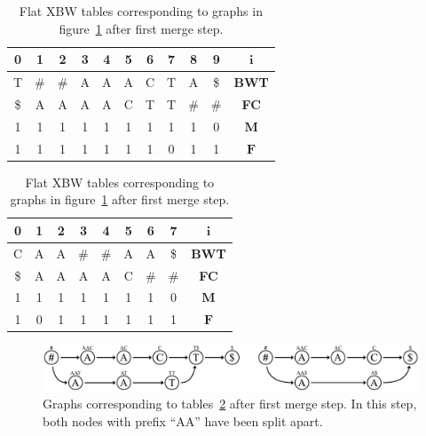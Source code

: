 \documentclass[a4paper,12pt,twoside,BCOR=10mm]{scrbook}
\begin{document}
\begin{table}[htb]
\centering
\caption[Flat XBW tables after first merge step]{Flat XBW tables corresponding to graphs in figure~\ref{fig:evo_fig_flat_merge_step_one} after first merge step.}
{
\renewcommand{\tabcolsep}{5pt}
\begin{tabular}{ | c | c | c | c | c | c | c | c | c | c | c | }
\hline
0 & 1 & 2 & 3 & 4 & 5 & 6 & 7 & 8 & 9 & $\boldsymbol{i}$ \\ \hline
T & $\#$ & $\#$ & A & A & A & C & T & A & \$ & \textbf{BWT} \\ \hline
\$ & A & A & A & A & C & T & T & $\#$ & $\#$ & \textbf{FC} \\ \hline
1 & 1 & 1 & 1 & 1 & 1 & 1 & 1 & 1 & 0 & $\boldsymbol{M}$ \\ \hline
1 & 1 & 1 & 1 & 1 & 1 & 1 & 0 & 1 & 1 & $\boldsymbol{F}$ \\ \hline
\end{tabular}
\quad
\begin{tabular}{ | c | c | c | c | c | c | c | c | c | }
\hline
0 & 1 & 2 & 3 & 4 & 5 & 6 & 7 & $\boldsymbol{i}$ \\ \hline
C & A & A & $\#$ & $\#$ & A & A & \$ & \textbf{BWT} \\ \hline
\$ & A & A & A & A & C & $\#$ & $\#$ & \textbf{FC} \\ \hline
1 & 1 & 1 & 1 & 1 & 1 & 1 & 0 & $\boldsymbol{M}$ \\ \hline
1 & 0 & 1 & 1 & 1 & 1 & 1 & 1 & $\boldsymbol{F}$ \\ \hline
\end{tabular}
}
\label{table:evo_fig_flat_merge_step_one}
\end{table}
\begin{figure}[!htb]
\centering
\includegraphics[width=\textwidth]{evo_fig_flat_merge_step_one.pdf}
\caption[Graphs after first merge step]{Graphs corresponding to tables~\ref{table:evo_fig_flat_merge_step_one} after first merge step. In this step, both nodes with prefix “AA” have been split apart.} \label{fig:evo_fig_flat_merge_step_one}
\end{figure}
\end{document}
